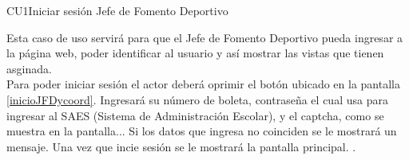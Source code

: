 \begin{UseCase}{CU1}{Iniciar sesión Jefe de Fomento Deportivo}{
		\noindent Esta caso de uso servirá para que el Jefe de Fomento Deportivo pueda ingresar a la página web, poder identificar al usuario y así mostrar las vistas que tienen asginada. \\
    	Para poder iniciar sesión el actor deberá oprimir el botón  ubicado en la pantalla \ref{inicioJFDycoord}. Ingresará su número de boleta, contraseña el cual usa para ingresar al SAES (Sistema de Administración Escolar), y el captcha, como se muestra en la pantalla... Si los datos que ingresa no coinciden se le mostrará un mensaje.
        Una vez que incie sesión se le mostrará la pantalla principal.
        .
        
	} \label{CU1_Iniciarsesion}
		\end{UseCase}
	\newpage
	

